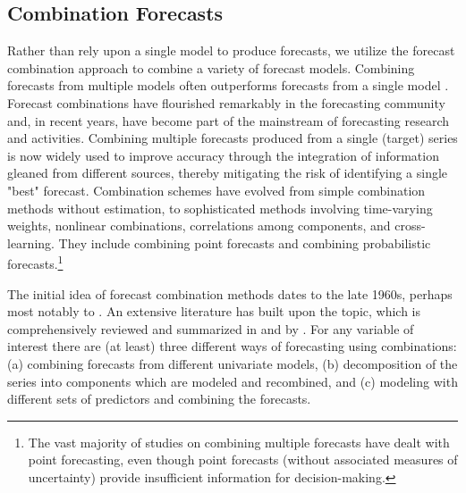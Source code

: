 \documentclass[
a4paper, %
12pt, %
]{CascadeAnalyticsWPS}
\begin{document}
\subsection{Combination Forecasts}
\label{sec:sec3.2}
Rather than rely upon a single model to produce forecasts, we utilize the forecast combination approach to combine a variety of forecast models. Combining forecasts from multiple models often outperforms forecasts from a single
model \citep{clemen86, elliott_handbook_2013}. Forecast combinations have flourished remarkably in the forecasting community and, in recent years, have become part of the mainstream of forecasting research and activities. Combining multiple forecasts produced from a single (target) series is now widely used to improve accuracy through the integration of information gleaned from different sources, thereby mitigating the risk of identifying a single "best" forecast. Combination schemes have evolved from simple combination methods without estimation, to sophisticated methods involving time-varying weights, nonlinear combinations, correlations among components, and cross-learning. They include combining point forecasts and combining probabilistic forecasts.\footnote{The vast majority of studies on combining multiple forecasts have dealt with point forecasting, even
though point forecasts (without associated measures of uncertainty) provide insufficient information for decision-making. } 


The initial idea of forecast combination methods dates to the late 1960s, perhaps most notably to \cite{bates_combination_1969}. An extensive literature has built upon the topic, which is comprehensively reviewed and summarized in \cite{elliott_handbook_2013} and by \cite{WANG2022}. For any variable of interest there are (at least) three different ways of forecasting using combinations: (a) combining forecasts from different univariate models, (b) decomposition of the series into components which are modeled and recombined, and (c) modeling with different sets of predictors and combining the forecasts. 
\end{document}
